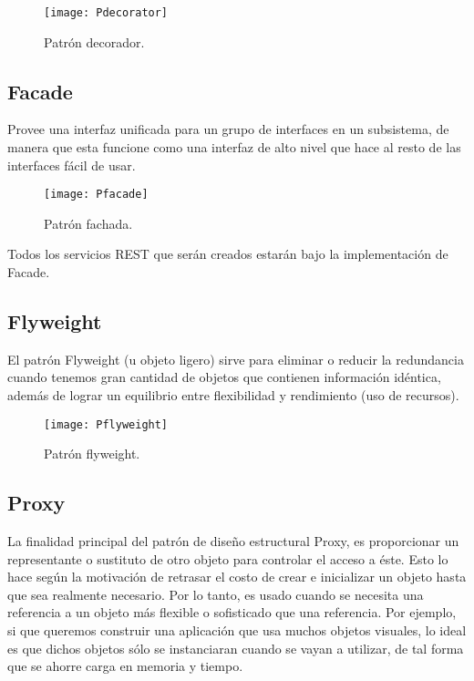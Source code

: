 \begin{figure}[H]
\centering
\texttt{[image: Pdecorator]}
\caption{Patrón decorador.}
\end{figure}


\subsection{Facade}

Provee una interfaz unificada para un grupo de interfaces en un subsistema, de manera que esta funcione como una interfaz de alto nivel que hace al resto de las interfaces fácil de usar.

\begin{figure}[H]
\centering
\texttt{[image: Pfacade]}
\caption{Patrón fachada.}
\end{figure}

Todos los servicios REST que serán creados estarán bajo la implementación de Facade.

\subsection{Flyweight}

El patrón Flyweight (u objeto ligero) sirve para eliminar o reducir la redundancia cuando tenemos gran cantidad de objetos que contienen información idéntica, además de lograr un equilibrio entre flexibilidad y rendimiento (uso de recursos).

\begin{figure}[H]
\centering
\texttt{[image: Pflyweight]}
\caption{Patrón flyweight.}
\end{figure}

\subsection{Proxy}

La finalidad principal del patrón de diseño estructural Proxy, es proporcionar un representante o sustituto de otro objeto para controlar el acceso a éste. Esto lo hace según la motivación de retrasar el costo de crear e inicializar un objeto hasta que sea realmente necesario. Por lo tanto, es usado cuando se necesita una referencia a un objeto más flexible o sofisticado que una referencia. Por ejemplo, si que queremos construir una aplicación que usa muchos objetos visuales, lo ideal es que dichos objetos sólo se instanciaran cuando se vayan a utilizar, de tal forma que se ahorre carga en memoria y tiempo.

